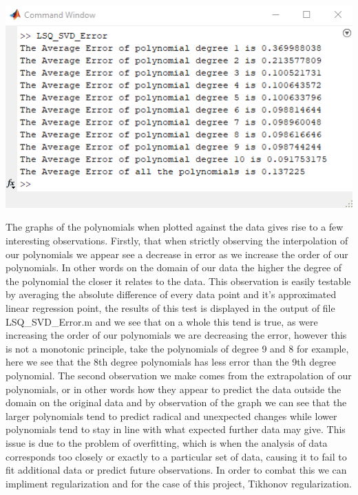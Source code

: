 \documentclass{report}
\begin{document}
\begin{tcolorbox}
\begin{center}
     \includegraphics[width=\textwidth]{Poly_test.png}
\end{center}
\end{tcolorbox}The graphs of the polynomials when plotted against the data gives rise to a few interesting observations. Firstly, that when strictly observing the interpolation of our polynomials we appear see a decrease in error as we increase the order of our polynomials. In other words on the domain of our data the higher the degree of the polynomial the closer it relates to the data. This observation is easily testable by averaging the absolute difference of every data point and it's approximated linear regression point, the results of this test is displayed in the output of file LSQ\_SVD\_Error.m and we see that on a whole this tend is true, as were increasing the order of our polynomials we are decreasing the error, however this is not a monotonic principle, take the polynomials of degree 9 and 8 for example, here we see that the 8th degree polynomials has less error than the 9th degree polynomial. The second observation we make comes from the extrapolation of our polynomials, or in other words how they appear to predict the data outside the domain on the original data and by observation of the graph we can see that the larger polynomials tend to predict radical and unexpected changes while lower polynomials tend to stay in line with what expected further data may give. This issue is due to the problem of overfitting, which is when the analysis of data corresponds too closely or exactly to a particular set of data, causing it to fail to fit additional data or predict future observations. In order to combat this we can impliment regularization and for the case of this project, Tikhonov regularization. 
\end{document}
